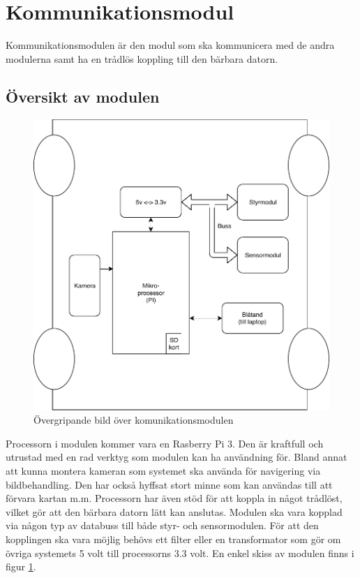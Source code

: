 \documentclass[systemskiss/skiss.tex]{subfiles}
\begin{document}
\section{Kommunikationsmodul}
Kommunikationsmodulen är den modul som ska kommunicera med de andra modulerna samt ha en trådlös koppling till den bärbara datorn. 
\subsection{Översikt av modulen}
\begin{figure}[h]
    \centering
    \includegraphics[width=0.6\linewidth]{systemskiss/figures/kommodul.pdf}
    \caption{Övergripande bild över komunikationsmodulen}
    \label{fig:komskiss}
\end{figure}
Processorn i modulen kommer vara en Rasberry Pi 3. Den är kraftfull och utrustad med en rad verktyg som modulen kan ha användning för. Bland annat att kunna montera kameran som systemet ska använda för navigering via bildbehandling. Den har också hyffsat stort minne som kan användas till att förvara kartan m.m. Processorn har även stöd för att koppla in något trådlöst, vilket gör att den bärbara datorn lätt kan anslutas. Modulen ska vara kopplad via någon typ av databuss till både styr- och sensormodulen. För att den kopplingen  ska vara möjlig behövs ett filter eller en transformator som gör om övriga systemets 5 volt till processorns 3.3 volt. En enkel skiss av modulen finns i figur \ref{fig:komskiss}.
\end{document}
